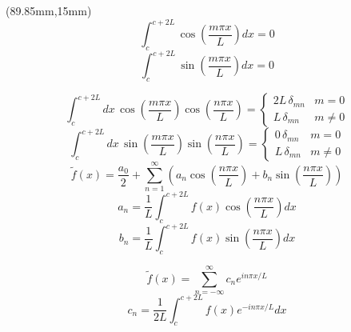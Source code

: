 \begin{textblock*}{100mm}(89.85mm,15mm)
\[
  \int_{c}^{c+2L} \cos \left( \frac{m \pi x}{L} \right) dx = 0
 \]
 \[
  \int_{c}^{c+2L} \sin \left( \frac{m \pi x}{L} \right) dx = 0
 \]
 
\[
  \int_{c}^{c+2L} dx \, \cos \left( \frac{m \pi x}{L} \right) \cos \left( \frac{n \pi x}{L} \right) = 
      \left\{ \begin{array}{cc} 2 L \, \delta_{mn} & m = 0 \\ L \, \delta_{mn} & m \neq 0 \end{array} \right.
\]
\[
  \int_{c}^{c+2L} dx \, \sin \left( \frac{m \pi x}{L} \right) \sin \left( \frac{n \pi x}{L} \right) = 
      \left\{ \begin{array}{cc} 0 \, \delta_{mn} & m = 0 \\ L \, \delta_{mn} & m \neq 0 \end{array} \right.
\]
\[
 {\tilde f}(x) = \frac{a_0}{2} + 
    \sum_{n=1}^{\infty} \left( a_n \cos \left( \frac{n \pi x}{L} \right) + b_n \sin \left( \frac{n \pi x}{L} \right) \right)
\]
\[
  a_n = \frac{1}{L} \int_{c}^{c+2L} f(x) \cos \left( \frac{n \pi x}{L} \right) dx
\]
\[
  b_n = \frac{1}{L} \int_{c}^{c+2L} f(x) \sin \left( \frac{n \pi x}{L} \right) dx
\]

\[
  {\tilde f}(x) = \sum_{n = - \infty}^{\infty} c_n e^{i n \pi x/L}
\]
\[
  c_n = \frac{1}{2 L} \int_{c}^{c+2L} f(x) e^{-i n \pi x/L} dx
\]
\end{textblock*}
\newpage